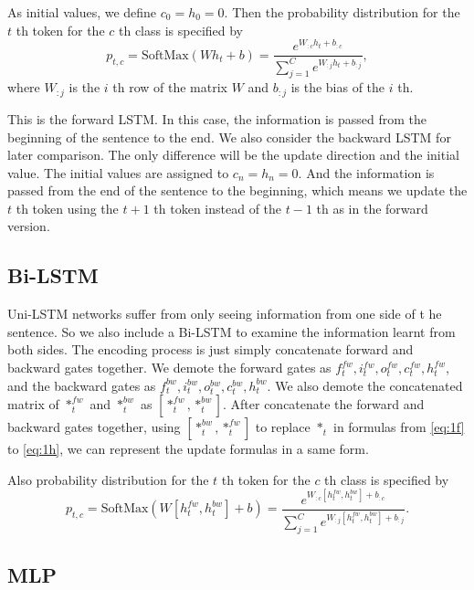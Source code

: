 \documentclass{article}
\begin{document}
As initial values, we define $c_0=h_0=0$. 
Then the probability distribution for the $t$ th token for the $c$ th class is specified by 
\begin{equation}
p_{t, c} = \text{SoftMax}(W h_t + b) = \frac{e^{W_{:c} h_t + b_{:c}}}{\sum_{j = 1} ^ C e^{W_{:j} h_t + b_{:j}}},
\end{equation}
where $W_{:j}$ is the $i$ th row of the matrix $W$ and $b_{:j}$ is the bias of the $i$ th.

This is the forward LSTM. In this case, the information is passed from the beginning of the sentence to the end. We also consider the backward LSTM for later comparison. The only difference will be the update direction and the initial value. The initial values are assigned to $c_n=h_n=0$. And the information is passed from the end of the sentence to the beginning, which means we update the $t$ th token using the $t+1$ th token instead of the $t-1$ th as in the forward version.

\subsection{Bi-LSTM}

Uni-LSTM networks suffer from only seeing information from one side of t he sentence. So we also include a Bi-LSTM to examine the information learnt from both sides. The encoding process is just simply concatenate forward and backward gates together. We demote the forward gates as $f_t^{fw}, i_t^{fw}, o_t^{fw}, c_t^{fw}, h_t^{fw}$, and the backward gates as $f_t^{bw}, i_t^{bw}, o_t^{bw}, c_t^{bw}, h_t^{bw}$. We also demote the concatenated matrix of $*_t^{fw}$ and $*_t^{bw}$ as $[*_t^{fw}, *_t^{bw}]$. After concatenate the forward and backward gates together, using $[*_t^{bw}, *_t^{fw}]$ to replace $*_t$ in formulas from \ref{eq:1f} to \ref{eq:1h}, we can represent the update formulas in a same form. 

Also probability distribution for the $t$ th token for the $c$ th class is specified by 
\begin{equation}
p_{t, c} = \text{SoftMax}(W [h_t^{fw}, h_t^{bw}] + b) = \frac{e^{W_{:c} [h_t^{fw}, h_t^{bw}] + b_{:c}}}{\sum_{j = 1} ^ C e^{W_{:j} [h_t^{fw}, h_t^{bw}] + b_{:j}}}.
\end{equation}

\subsection{MLP}
\end{document}
